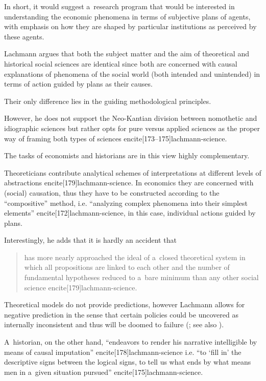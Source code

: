 {In short, it would suggest a~research program that would be interested in understanding the economic phenomena in terms of subjective plans of agents, with emphasis on how they are shaped by particular institutions as perceived by these agents.



Lachmann argues that both the subject matter and the aim of theoretical and historical social sciences are identical since both are concerned with causal explanations of phenomena of the social world (both intended and unintended) in terms of action guided by plans as their causes.

Their only difference lies in the guiding methodological principles.

However, he does not support the Neo-Kantian division between nomothetic and idiographic sciences but rather opts for pure versus applied sciences as the proper way of framing both types of sciences encite[173--175]{lachmann-science}.



The tasks of economists and historians are in this view highly complementary.

Theoreticians contribute analytical schemes of interpretations at different levels of abstractions encite[179]{lachmann-science}. In economics they are concerned with (social) causation, thus they have to be constructed according to the ``compositive'' method, i.e. ``analyzing complex phenomena into their simplest elements'' encite[172]{lachmann-science}, in this case, individual actions guided by plans.

Interestingly, he adds that it is hardly an accident that

\begin{quote}

has more nearly approached the ideal of a~closed theoretical system in which all propositions are linked to each other and the number of fundamental hypotheses reduced to a~bare minimum than any other social science encite[179]{lachmann-science}.

\end{quote}

Theoretical models do not provide predictions, however Lachmann allows for negative prediction in the sense that certain policies could be uncovered as internally inconsistent and thus will be doomed to failure (\cite[89]{lachmann-shackle-time}; see also \cite[7--8]{lachmann-shackle-place}).



A~historian, on the other hand, ``endeavors to render his narrative intelligible by means of causal imputation'' encite[178]{lachmann-science} i.e. ``to `fill in' the descriptive signs between the logical signs, to tell us what ends by what means men in a~given situation pursued'' encite[175]{lachmann-science}.



}
